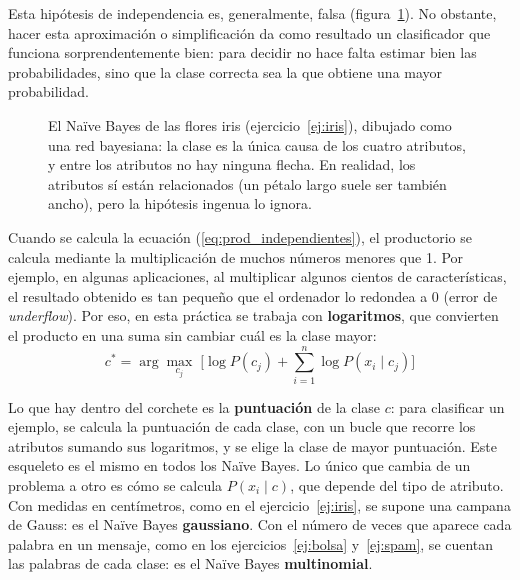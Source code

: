 \documentclass{article}
\begin{document}
Esta hipótesis de independencia es, generalmente, falsa (figura~\ref{fig:red}). No obstante, hacer esta aproximación o simplificación da como resultado un clasificador que funciona sorprendentemente bien: para decidir no hace falta estimar bien las probabilidades, sino que la clase correcta sea la que obtiene una mayor probabilidad.

\begin{figure}[h]
\centering
{}
\caption{El Naïve Bayes de las flores iris (ejercicio~\ref{ej:iris}), dibujado como una red bayesiana: la clase es la única causa de los cuatro atributos, y entre los atributos no hay ninguna flecha. En realidad, los atributos sí están relacionados (un pétalo largo suele ser también ancho), pero la hipótesis ingenua lo ignora.}
\label{fig:red}
\end{figure}

Cuando se calcula la ecuación (\ref{eq:prod_independientes}), el productorio se calcula mediante la multiplicación de muchos números menores que 1. Por ejemplo, en algunas aplicaciones, al multiplicar algunos cientos de características, el resultado obtenido es tan pequeño que el ordenador lo redondea a 0 (error de \textit{underflow}). Por eso, en esta práctica se trabaja con \textbf{logaritmos}, que convierten el producto en una suma sin cambiar cuál es la clase mayor:
\begin{equation}\label{eq:max_log_P}
c^* = \arg\max_{c_j} \; \Big[ \log P(c_j) + \sum_{i=1}^{n} \log P(x_i \mid c_j) \Big]
\end{equation}

Lo que hay dentro del corchete es la \textbf{puntuación} de la clase $c$: para clasificar un ejemplo, se calcula la puntuación de cada clase, con un bucle que recorre los atributos sumando sus logaritmos, y se elige la clase de mayor puntuación. Este esqueleto es el mismo en todos los Naïve Bayes. Lo único que cambia de un problema a otro es cómo se calcula $P(x_i \mid c)$, que depende del tipo de atributo. Con medidas en centímetros, como en el ejercicio~\ref{ej:iris}, se supone una campana de Gauss: es el Naïve Bayes \textbf{gaussiano}. Con el número de veces que aparece cada palabra en un mensaje, como en los ejercicios~\ref{ej:bolsa} y~\ref{ej:spam}, se cuentan las palabras de cada clase: es el Naïve Bayes \textbf{multinomial}.
\end{document}
